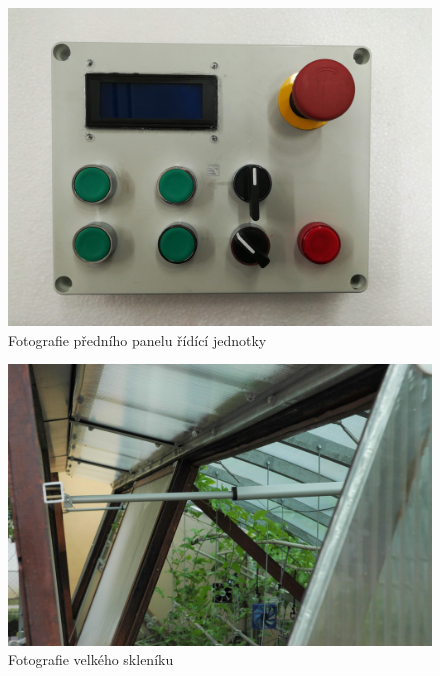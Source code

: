 \begin{figure}[htbp]
    \includegraphics[width=\textwidth]{img/ridiciJednotka.jpg}
    \caption{Fotografie předního panelu řídící jednotky}
    \label{fig:panel} 
\end{figure}

\begin{figure}[htbp]
    \includegraphics[width=\textwidth]{img/VS_1.jpg}
    \caption{Fotografie velkého skleníku}
    \label{fig:VS1} 
\end{figure}

